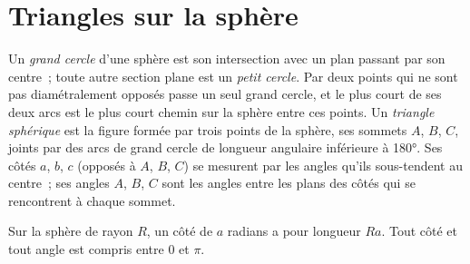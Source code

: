 \section{Triangles sur la sphère}

\begin{definition}\label{def:b1:spherical-astronomy:spherical-triangle}
Un \emph{grand cercle} d'une sphère est son intersection
avec un plan passant par son centre~; toute autre section plane est un
\emph{petit cercle}. Par deux points qui ne sont pas
diamétralement opposés passe un seul grand cercle, et le plus court de ses
deux arcs est le plus court chemin sur la sphère entre ces points. Un
\emph{triangle sphérique} est la figure formée par
trois points de la sphère, ses sommets $A$, $B$, $C$, joints par des arcs de
grand cercle de longueur angulaire inférieure à \ang{180}. Ses côtés $a$, $b$,
$c$ (opposés à $A$, $B$, $C$) se mesurent par les angles qu'ils sous-tendent au
centre~; ses angles $A$, $B$, $C$ sont les angles entre les plans des côtés
qui se rencontrent à chaque sommet.
\end{definition}

Sur la sphère de rayon $R$, un côté de $a$ radians a pour longueur $Ra$. Tout
côté et tout angle est compris entre $0$ et $\pi$.

